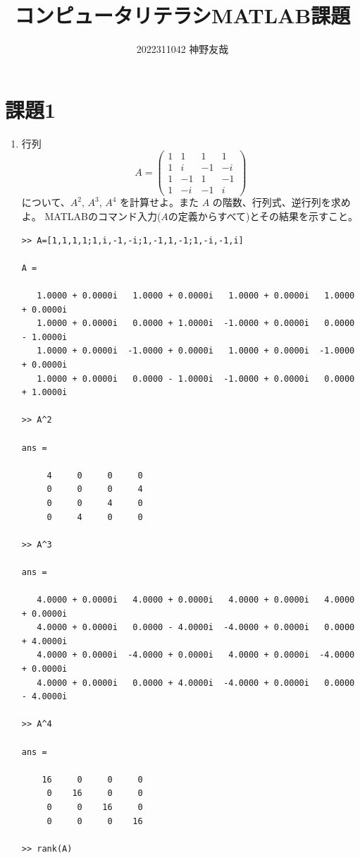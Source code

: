 \documentclass[dvipdfmx]{jsarticle}
\author{2022311042 神野友哉}
\title{コンピュータリテラシMATLAB課題}
\begin{document}
\maketitle
\section*{課題1}
\begin{enumerate}[(1)]
\item 行列
\[
A=\left(\begin{array}{cccc}
1 & 1 &  1 &  1 \\
1 & i & -1 & -i \\
1 & -1 & 1 & -1 \\
1 & -i & -1 & i
\end{array}\right)
\]
について、$A^2$, $A^3$, $A^4$ を計算せよ。また $A$ の階数、行列式、逆行列を求めよ。
MATLABのコマンド入力($A$の定義からすべて)とその結果を示すこと。
\begin{verbatim}
>> A=[1,1,1,1;1,i,-1,-i;1,-1,1,-1;1,-i,-1,i]
 
A =

   1.0000 + 0.0000i   1.0000 + 0.0000i   1.0000 + 0.0000i   1.0000 + 0.0000i
   1.0000 + 0.0000i   0.0000 + 1.0000i  -1.0000 + 0.0000i   0.0000 - 1.0000i
   1.0000 + 0.0000i  -1.0000 + 0.0000i   1.0000 + 0.0000i  -1.0000 + 0.0000i
   1.0000 + 0.0000i   0.0000 - 1.0000i  -1.0000 + 0.0000i   0.0000 + 1.0000i

>> A^2    

ans =

     4     0     0     0
     0     0     0     4
     0     0     4     0
     0     4     0     0

>> A^3

ans =

   4.0000 + 0.0000i   4.0000 + 0.0000i   4.0000 + 0.0000i   4.0000 + 0.0000i
   4.0000 + 0.0000i   0.0000 - 4.0000i  -4.0000 + 0.0000i   0.0000 + 4.0000i
   4.0000 + 0.0000i  -4.0000 + 0.0000i   4.0000 + 0.0000i  -4.0000 + 0.0000i
   4.0000 + 0.0000i   0.0000 + 4.0000i  -4.0000 + 0.0000i   0.0000 - 4.0000i

>> A^4

ans =

    16     0     0     0
     0    16     0     0
     0     0    16     0
     0     0     0    16

>> rank(A)


\end{verbatim}
\end{enumerate}
\end{document}
